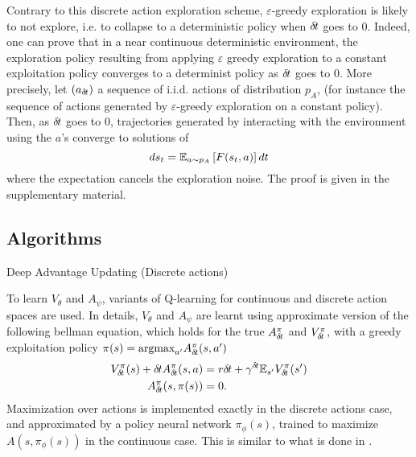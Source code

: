 Contrary to this discrete action exploration scheme, $\varepsilon$-greedy
exploration is likely to not explore, i.e. to collapse to a deterministic
policy when ${\delta\hspace{-.1em}t}$ goes to $0$. Indeed, one can prove that in a near
continuous deterministic environment, the exploration policy resulting from
applying $\varepsilon$ greedy exploration to a constant exploitation policy
converges to a determinist policy as ${\delta\hspace{-.1em}t}$ goes to $0$. More precisely, let
$(a_{\delta\hspace{-.1em}t})$ a sequence of i.i.d. actions of distribution $p_A$, (for instance
the sequence of actions generated by $\varepsilon$-greedy exploration on a
constant policy). Then, as ${\delta\hspace{-.1em}t}$ goes to $0$, trajectories generated by
interacting with the environment using the $a$'s converge to solutions of
\begin{equation}
	ds_t = \mathbb{E}_{a\sim p_A}\left[F(s_t, a)\right]dt
\end{equation}
where the expectation cancels the exploration noise. The proof is given in the
supplementary material.

\subsection{Algorithms}
\label{subsec:algorithm}
\begin{algorithm}[ht]
  \caption{Deep Advantage Updating (Discrete actions)}
  \label{alg:dau}
	
\end{algorithm}

To learn $V_{\theta}$ and $A_{\psi}$, variants of Q-learning for continuous and
discrete action spaces are used. In details, $V_{\theta}$ and $A_{\psi}$ are learnt
using approximate version of the following bellman equation, which holds for the true $A^\pi_{\delta\hspace{-.1em}t}$
and $V^\pi_{\delta\hspace{-.1em}t}$, with a greedy exploitation policy $\pi(s) = \text{argmax}_{a'}A^\pi_{\delta\hspace{-.1em}t}(s, a')$
\begin{align}
	V^{\pi}_{\delta\hspace{-.1em}t}(s) + {\delta\hspace{-.1em}t} A^{\pi}_{\delta\hspace{-.1em}t}(s, a) &= r{\delta\hspace{-.1em}t} + \gamma^{{\delta\hspace{-.1em}t}}  \mathbb{E}_{s'} V^{\pi}_{\delta\hspace{-.1em}t}(s')\label{eq:bellman_A}\\
	A^{\pi}_{\delta\hspace{-.1em}t}(s, \pi(s)) &= 0\label{eq:max_A}.
\end{align}
Maximization over actions is implemented exactly in the discrete actions case,
and approximated by a policy neural network $\pi_\phi(s)$, trained to maximize $A(s,
\pi_\phi(s))$ in the continuous case.  This is similar to what is done in
\cite{ddpg}.

